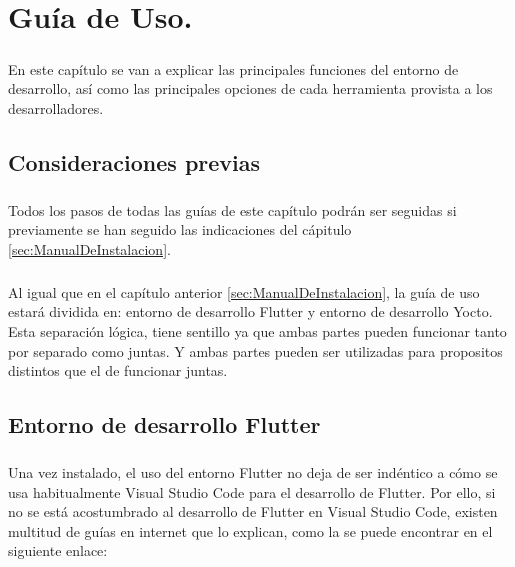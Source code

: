 \chapter{Guía de Uso.}\label{sec:GuiaDeUso}

\paragraph{}En este capítulo se van a explicar las principales funciones del entorno de
desarrollo, así como las principales opciones de cada herramienta provista a los
desarrolladores.

\section{Consideraciones previas}

\paragraph{}Todos los pasos de todas las guías de este capítulo podrán ser seguidas si
previamente se han seguido las indicaciones del cápitulo \ref{sec:ManualDeInstalacion}.

\paragraph{}Al igual que en el capítulo anterior \ref{sec:ManualDeInstalacion}, la guía
de uso estará dividida en: entorno de desarrollo Flutter y entorno de desarrollo Yocto.
Esta separación lógica, tiene sentillo ya que ambas partes pueden funcionar tanto por
separado como juntas. Y ambas partes pueden ser utilizadas para propositos distintos
que el de funcionar juntas.

\section{Entorno de desarrollo Flutter}

\paragraph{}Una vez instalado, el uso del entorno Flutter no deja de ser indéntico a
cómo se usa habitualmente Visual Studio Code para el desarrollo de Flutter. Por ello,
si no se está acostumbrado al desarrollo de Flutter en Visual Studio Code, existen
multitud de guías en internet que lo explican, como la se puede encontrar en el
siguiente enlace:

